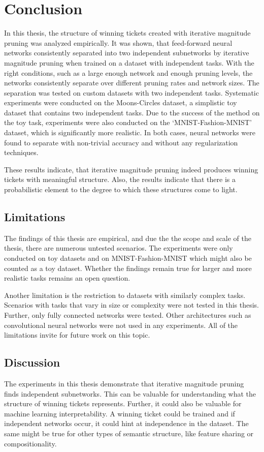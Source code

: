\chapter{Conclusion}\label{chapter:conclusion} 

In this thesis, the structure of winning tickets created with iterative magnitude pruning was analyzed empirically.
It was shown, that feed-forward neural networks consistently separated into two independent subnetworks by iterative magnitude pruning when trained on a dataset with independent tasks.
With the right conditions, such as a large enough network and enough pruning levels, the networks consistently separate over different pruning rates and network sizes.
The separation was tested on custom datasets with two independent tasks.
Systematic experiments were conducted on the Moons-Circles dataset, a simplistic toy dataset that contains two independent tasks.
Due to the success of the method on the toy task, experiments were also conducted on the `MNIST-Fashion-MNIST' dataset, which is significantly more realistic.
In both cases, neural networks were found to separate with non-trivial accuracy and without any regularization techniques.

These results indicate, that iterative magnitude pruning indeed produces winning tickets with meaningful structure.
Also, the results indicate that there is a probabilistic element to the degree to which these structures come to light.

\section{Limitations}
The findings of this thesis are empirical, and due the the scope and scale of the thesis, there are numerous untested scenarios.
The experiments were only conducted on toy datasets and on MNIST-Fashion-MNIST which might also be counted as a toy dataset.
Whether the findings remain true for larger and more realistic tasks remains an open question.

Another limitation is the restriction to datasets with similarly complex tasks.
Scenarios with tasks that vary in size or complexity were not tested in this thesis.
Further, only fully connected networks were tested.
Other architectures such as convolutional neural networks were not used in any experiments.
All of the limitations invite for future work on this topic.

\section{Discussion}
The experiments in this thesis demonstrate that iterative magnitude pruning finds independent subnetworks.
This can be valuable for understanding what the structure of winning tickets represents.
Further, it could also be valuable for machine learning interpretability.
A winning ticket could be trained and if independent networks occur, it could hint at independence in the dataset.
The same might be true for other types of semantic structure, like feature sharing or compositionality.

